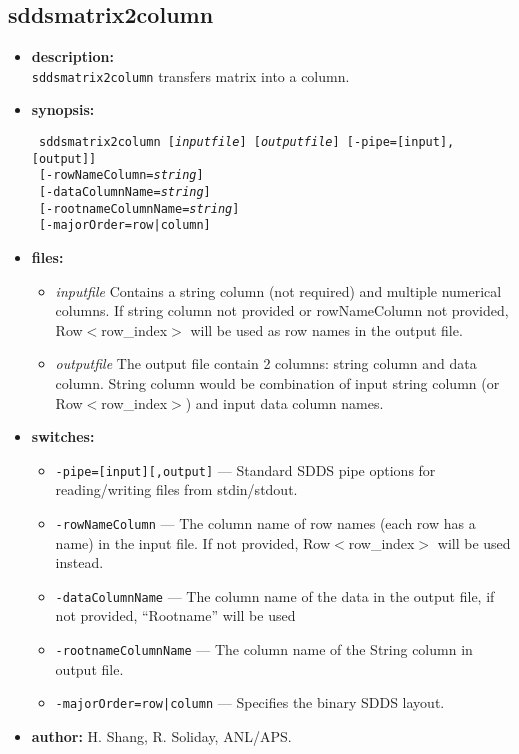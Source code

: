 \newpage 
\subsection{sddsmatrix2column} 
\label{sddsmatrix2column} 
 
\begin{itemize} 
\item {\bf description:} \hspace*{1mm}\\ 
{\tt sddsmatrix2column} transfers matrix into a column.

\item {\bf synopsis:}  
\begin{flushleft}
{\tt 
sddsmatrix2column [{\em inputfile}] [{\em outputfile}] [-pipe=[input],[output]] \\ \
{}[-rowNameColumn={\em string}] \\ \
{}[-dataColumnName={\em string}] \\ \
{}[-rootnameColumnName={\em string}] \\ \
{}[-majorOrder=row|column]}
\end{flushleft} 

\item {\bf files:}
    \begin{itemize} 
    \item {\em inputfile} Contains a string column (not required) and multiple numerical columns. If string column not provided or rowNameColumn not provided, Row$<$row\_index$>$ will be used as row names in the output file.
    \item {\em outputfile} The output file contain 2 columns: string column and data column. String column would be combination of input string column (or Row$<$row\_index$>$) and input data column names.
    \end{itemize} 

\item {\bf switches:} 
    \begin{itemize} 
    \item {\tt -pipe=[input][,output]} --- Standard SDDS pipe options for reading/writing files from stdin/stdout.
    \item {\tt -rowNameColumn} --- The column name of row names (each row has a name) in the input file. If not provided, Row$<$row\_index$>$ will be used instead. 
    \item {\tt -dataColumnName} --- The column name of the data in the output file, if not provided, ``Rootname'' will be used
    \item {\tt -rootnameColumnName} --- The column name of the String column in output file.
    \item {\tt -majorOrder=row|column} --- Specifies the binary SDDS layout.
    \end{itemize} 

\item {\bf author:} H. Shang, R. Soliday, ANL/APS. 
\end{itemize} 
